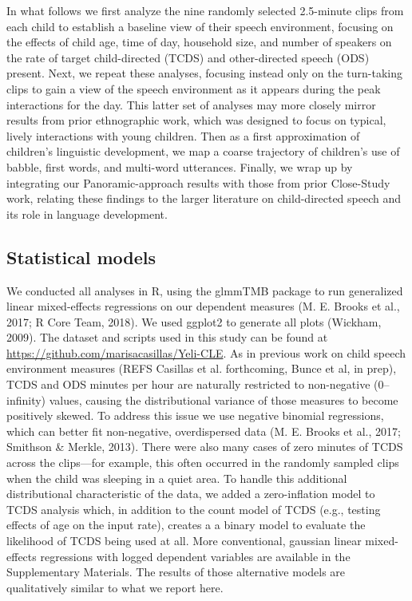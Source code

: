 \documentclass[,man,floatsintext]{apa6}
\begin{document}
In what follows we first analyze the nine randomly selected 2.5-minute
clips from each child to establish a baseline view of their speech
environment, focusing on the effects of child age, time of day,
household size, and number of speakers on the rate of target
child-directed (TCDS) and other-directed speech (ODS) present. Next, we
repeat these analyses, focusing instead only on the turn-taking clips to
gain a view of the speech environment as it appears during the peak
interactions for the day. This latter set of analyses may more closely
mirror results from prior ethnographic work, which was designed to focus
on typical, lively interactions with young children. Then as a first
approximation of children's linguistic development, we map a coarse
trajectory of children's use of babble, first words, and multi-word
utterances. Finally, we wrap up by integrating our Panoramic-approach
results with those from prior Close-Study work, relating these findings
to the larger literature on child-directed speech and its role in
language development.

\subsection{Statistical models}\label{statistical-models}

We conducted all analyses in R, using the glmmTMB package to run
generalized linear mixed-effects regressions on our dependent measures
(M. E. Brooks et al., 2017; R Core Team, 2018). We used ggplot2 to
generate all plots (Wickham, 2009). The dataset and scripts used in this
study can be found at \url{https://github.com/marisacasillas/Yeli-CLE}.
As in previous work on child speech environment measures (REFS Casillas
et al. forthcoming, Bunce et al, in prep), TCDS and ODS minutes per hour
are naturally restricted to non-negative (0--infinity) values, causing
the distributional variance of those measures to become positively
skewed. To address this issue we use negative binomial regressions,
which can better fit non-negative, overdispersed data (M. E. Brooks et
al., 2017; Smithson \& Merkle, 2013). There were also many cases of zero
minutes of TCDS across the clips---for example, this often occurred in
the randomly sampled clips when the child was sleeping in a quiet area.
To handle this additional distributional characteristic of the data, we
added a zero-inflation model to TCDS analysis which, in addition to the
count model of TCDS (e.g., testing effects of age on the input rate),
creates a a binary model to evaluate the likelihood of TCDS being used
at all. More conventional, gaussian linear mixed-effects regressions
with logged dependent variables are available in the Supplementary
Materials. The results of those alternative models are qualitatively
similar to what we report here.
\end{document}
